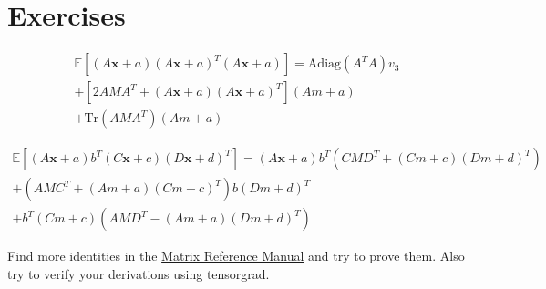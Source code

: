 \section{Exercises}
\begin{exercise}
   \begin{align*}
   \mathbb{E}[(A\mathbf{x} + a)(A\mathbf{x} + a)^T (A\mathbf{x} + a)] = 
   \text{Adiag}(A^T A) v_3 \\
   + [2 AMA^T + (A\mathbf{x} + a)(A\mathbf{x} + a)^T] (Am + a) \\
   + \text{Tr}(AMA^T)(Am + a)
   \end{align*}

   \begin{align*}
   \mathbb{E}[(A\mathbf{x} + a) b^T (C\mathbf{x} + c)(D\mathbf{x} + d)^T] = 
   (A\mathbf{x} + a) b^T (CMD^T + (Cm + c)(Dm + d)^T) \\
   + (AMC^T + (Am + a)(Cm + c)^T) b(Dm + d)^T \\
   + b^T (Cm + c)(AMD^T - (Am + a)(Dm + d)^T)
   \end{align*}
\end{exercise}
\begin{exercise}
   Find more identities in the \href{http://www.ee.ic.ac.uk/hp/staff/dmb/matrix/expect.html}{Matrix Reference Manual} and try to prove them.
   Also try to verify your derivations using tensorgrad.
\end{exercise}
